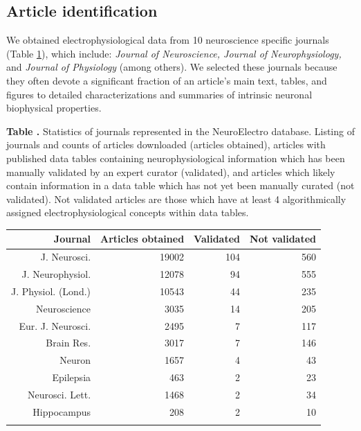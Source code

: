 \documentclass{template/frontiersSCNS} %
\begin{document}
\subsection{Article identification}
We obtained electrophysiological data from 10 neuroscience specific journals (Table \ref{tab:journal_listing}), which include: \emph{Journal of Neuroscience, Journal of Neurophysiology,} and \emph{Journal of Physiology} (among others). 
We selected these journals because they often devote a significant fraction of an article's main text, tables, and figures to detailed characterizations and summaries of intrinsic neuronal biophysical properties. 

\begin{table}[!t]
\textbf{\label{tab:journal_listing} Table .}
{Statistics of journals represented in the NeuroElectro database. Listing of journals and counts of articles downloaded (articles obtained), articles with published data tables containing neurophysiological information which has been manually validated by an expert curator (validated), and articles which likely contain information in a data table which has not yet been manually curated (not validated). 
Not validated articles are those which have at least 4 algorithmically assigned electrophysiological concepts within data tables.}
\processtable{}
{\begin{tabular}{rrrr}
    \toprule
    Journal & Articles obtained & Validated & Not validated \\
    \midrule
    J. Neurosci. & 19002 & 104   & 560 \\
    J. Neurophysiol. & 12078 & 94    & 555 \\
    J. Physiol. (Lond.) & 10543 & 44    & 235 \\
    Neuroscience & 3035  & 14    & 205 \\
    Eur. J. Neurosci. & 2495  & 7     & 117 \\
    Brain Res. & 3017  & 7     & 146 \\
    Neuron & 1657  & 4     & 43 \\
    Epilepsia & 463   & 2     & 23 \\
    Neurosci. Lett. & 1468  & 2     & 34 \\
    Hippocampus & 208   & 2     & 10 \\
    \botrule
    \end{tabular}}
   {}
\end{table}
\end{document}
